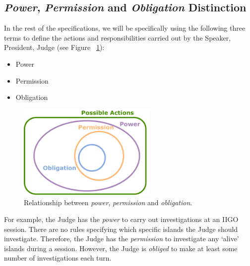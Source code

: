 \subsection{\emph{Power}, \emph{Permission} and \emph{Obligation} Distinction}
In the rest of the specifications, we will be specifically using the following three terms to define the actions and responsibilities carried out by the Speaker, President, Judge (see Figure~ \ref{fig:per_obl_sets}):
\begin{itemize}
    \item Power
    \item Permission
    \item Obligation
\end{itemize}



\begin{figure}[H]
\centering
\includegraphics[width=0.6\textwidth]{05_iigo/images/SOMAS_per_obl.pdf}
\caption{Relationship between \emph{power}, \emph{permission} and \emph{obligation}.}
\label{fig:per_obl_sets}
\end{figure}


For example, the Judge has the \emph{power} to carry out investigations at an IIGO session. There are no rules specifying which specific islands the Judge should investigate. Therefore, the Judge has the \emph{permission} to investigate any `alive' islands during a session. However, the Judge is \emph{obliged} to make at least some number of investigations each turn.



